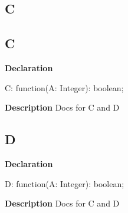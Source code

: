 \documentclass{report}
\newif\ifpdf
\begin{document}
\subsection*{\large{\textbf{C}}\normalsize\hspace{1ex}\hrulefill}
\else
\subsection*{C}
\fi
\label{ok_multiple_vars-C}
\begin{list}{}{
\setlength{\itemindent}{0cm}
\setlength{\listparindent}{0cm}
\setlength{\leftmargin}{\evensidemargin}
\addtolength{\leftmargin}{\tmplength}
\settowidth{\labelsep}{X}
\addtolength{\leftmargin}{\labelsep}
\setlength{\labelwidth}{\tmplength}
}
\item[\textbf{Declaration}\hfill]
\ifpdf
\begin{flushleft}
\fi
\begin{ttfamily}
C: function(A: Integer): boolean;\end{ttfamily}

\ifpdf
\end{flushleft}
\fi

\par
\item[\textbf{Description}]
Docs for C and D

\end{list}
\ifpdf
\subsection*{\large{\textbf{D}}\normalsize\hspace{1ex}\hrulefill}
\else
\subsection*{D}
\fi
\label{ok_multiple_vars-D}
\begin{list}{}{
\setlength{\itemindent}{0cm}
\setlength{\listparindent}{0cm}
\setlength{\leftmargin}{\evensidemargin}
\addtolength{\leftmargin}{\tmplength}
\settowidth{\labelsep}{X}
\addtolength{\leftmargin}{\labelsep}
\setlength{\labelwidth}{\tmplength}
}
\item[\textbf{Declaration}\hfill]
\ifpdf
\begin{flushleft}
\fi
\begin{ttfamily}
D: function(A: Integer): boolean;\end{ttfamily}

\ifpdf
\end{flushleft}
\fi

\par
\item[\textbf{Description}]
Docs for C and D

\end{list}
\end{document}
